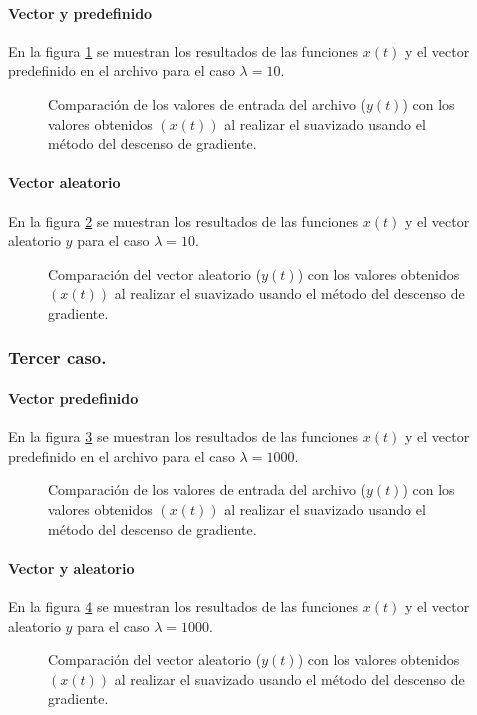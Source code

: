 \paragraph{Vector y predefinido}

En la figura \ref{fig:lambda_10_test} se muestran los resultados de las funciones $x(t)$ y el vector predefinido en el archivo  para el caso $\lambda=10$.

\begin{figure}[H]
    \centering
    \caption{Comparación de los valores de entrada del archivo  ($y(t)$) con los valores obtenidos $(x(t))$ al realizar el suavizado usando el método del descenso de gradiente.}
    \label{fig:lambda_10_test}
\end{figure}

\paragraph{Vector aleatorio}

En la figura \ref{fig:lambda_10} se muestran los resultados de las funciones $x(t)$ y el vector aleatorio $y$ para el caso $\lambda=10$.

\begin{figure}[H]
    \centering
    \caption{Comparación del vector aleatorio ($y(t)$) con los valores obtenidos $(x(t))$ al realizar el suavizado usando el método del descenso de gradiente.}
    \label{fig:lambda_10}
\end{figure}

\subsubsection{Tercer caso.}

\paragraph{Vector predefinido}

En la figura \ref{fig:lambda_1000_test} se muestran los resultados de las funciones $x(t)$ y el vector predefinido en el archivo  para el caso $\lambda=1000$.

\begin{figure}[H]
    \centering
    \caption{Comparación de los valores de entrada del archivo  ($y(t)$) con los valores obtenidos $(x(t))$ al realizar el suavizado usando el método del descenso de gradiente.}
    \label{fig:lambda_1000_test}
\end{figure}

\paragraph{Vector y aleatorio}

En la figura \ref{fig:lambda_1000} se muestran los resultados de las funciones $x(t)$ y el vector aleatorio $y$ para el caso $\lambda=1000$.

\begin{figure}[H]
    \centering
    \caption{Comparación del vector aleatorio ($y(t)$) con los valores obtenidos $(x(t))$ al realizar el suavizado usando el método del descenso de gradiente.}
    \label{fig:lambda_1000}
\end{figure}